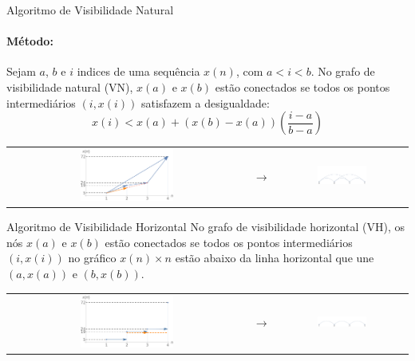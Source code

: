\documentclass[12pt,
aspectratio=169,
]{beamer}
\begin{document}
\begin{frame}{Algoritmo de Visibilidade Natural}
\paragraph{Método:} Sejam $a$, $b$ e $i$ indices de uma sequência
$x(n)$, com  $a < i < b$. No grafo de visibilidade
natural (VN), $x(a)$ e $x(b)$ estão conectados se todos os pontos
intermediários $(i, x(i))$ satisfazem a desigualdade:
\begin{equation}
\label{nv}
x(i) < x(a) + \left( x(b)-x(a) \right) \left(
\frac{i - a}{b-a} \right)
\end{equation}

\begin{tabular}{c c c}
      \includegraphics[width=0.4\textwidth]{images/example-plot-natural.pdf} & $\to$
     & \includegraphics[width=0.4\textwidth]{images/example-graph-natural.pdf} \\
\end{tabular}
   
\end{frame}


\begin{frame}{Algoritmo de Visibilidade Horizontal}
No grafo de visibilidade horizontal (VH), os nós
$x(a)$ e $x(b)$ estão conectados se
todos os pontos intermediários $(i,x(i))$ no gráfico $x(n) \times
n$ estão abaixo da linha horizontal que une  $(a, x(a))$ e
$(b,x(b))$. 

\begin{tabular}{c c c}
      \includegraphics[width=0.4\textwidth]{images/example-plot-horizontal.pdf} & $\to$
     & \includegraphics[width=0.4\textwidth]{images/example-graph-horizontal.pdf} \\
\end{tabular}
   
\end{frame}
\end{document}
